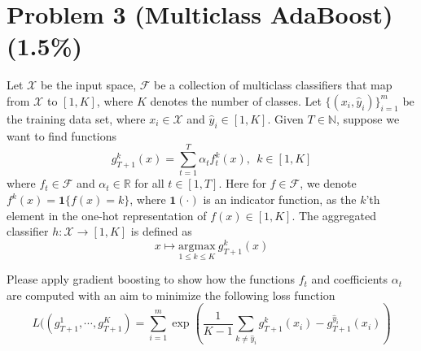 \documentclass{article}
\begin{document}
\section*{Problem 3 (Multiclass AdaBoost)(1.5\%)}
Let $\mathcal{X}$ be the input space, $\mathscr F$ be a collection of multiclass classifiers that map from $\mathcal{X}$ to $[1, K]$, where $K$ denotes the number of classes.  Let $\{(x_i,{\hat y}_i)\}_{i=1}^m$ be the training data set, where $x_i \in \mathcal{X}$ and ${\hat y}_i \in [1,K]$.  Given $T \in \mathbb{N}$, suppose we want to find functions 
\begin{equation*}
g_{T+1}^k(x) = \sum_{t=1}^T \alpha_t f_t^k(x), ~~ k \in [ 1,K ]
\end{equation*}
where $f_t \in \mathscr F$ and $\alpha_t \in \mathbb{R}$ for all $t \in [1, T]$. Here for $f \in \mathscr F$, we denote $f^k(x) = \mathbf{1}\{f(x) = k\}$, where $\mathbf{1}(\cdot)$ is an indicator function, as the $k$'th element in the one-hot representation of $f(x) \in [ 1,K ]$. The aggregated classifier $h: \mathcal{X} \rightarrow [ 1,K ]$ is defined as
\begin{equation*}
x \mapsto \underset{1 \leq k \leq K}{\mbox{argmax}} ~ g_{T+1}^k(x)
\end{equation*}

Please apply gradient boosting to show how the functions $f_t$ and coefficients $\alpha_t$ are computed with an aim to minimize the following loss function
\begin{equation*}
L((g_{T+1}^1, \cdots, g_{T+1}^K) = \sum_{i=1}^m \exp\left(\frac{1}{K-1}\sum_{k \neq {\hat y}_i} g_{T+1}^{k}(x_i) - g_{T+1}^{{\hat y}_i}(x_i) \right)
\end{equation*}
\end{document}
